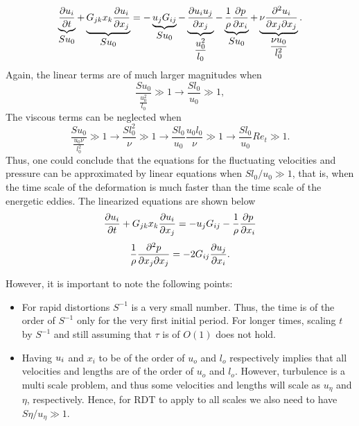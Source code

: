 \documentclass[oneside,a4paper,11pt]{report}
\begin{document}
\begin{equation}
\underbrace{\frac{\partial u_i}{\partial t}}_{\displaystyle Su_0} + \underbrace{G_{jk} x_k \frac{\partial u_i}{\partial x_j}}_{ \displaystyle Su_0} = -\underbrace{u_j G_{ij}}_{\displaystyle S u_0} - \underbrace{\frac{\partial u_i u_j}{\partial x_j}}_{\dfrac{u_0^2}{l_0}} - \underbrace{\frac{1}{\rho} \frac{\partial p}{\partial x_i}}_{\displaystyle Su_0} + \underbrace{\nu \frac{\partial^2 u_i}{\partial x_j \partial x_j}}_{\dfrac{\nu u_0}{l_0^2}}. 
\end{equation}
Again, the linear terms are of much larger magnitudes when
\begin{equation}
\frac{Su_0}{\frac{u_0^2}{l_0}} \gg 1 \to \frac{Sl_0}{u_0} \gg 1,
\end{equation}
The viscous terms can be neglected when
\begin{equation}
\frac{Su_0}{\frac{u_0\nu}{l_0^2}} \gg 1 \to \frac{Sl_0^2}{\nu} \gg 1 \to \frac{Sl_0}{u_0}\frac{u_0l_0}{\nu} \gg 1 \to \frac{Sl_0}{u_0} Re_t \gg 1.
\end{equation}
Thus, one could conclude that the equations for the fluctuating velocities and pressure can be approximated by linear equations when $Sl_0/u_0 \gg 1$, that is, when the time scale of the deformation is much faster than the time scale of the energetic eddies. The linearized equations are shown below
\begin{equation}
\label{ulin}
\frac{\partial u_i}{\partial t} + G_{jk}x_k \frac{\partial u_i}{\partial x_j} = - u_j G_{ij} -\frac{1}{\rho}\frac{\partial p}{\partial x_i}
\end{equation}
\begin{equation}
\frac{1}{\rho} \frac{\partial^2 p}{\partial x_j \partial x_j} = -2G_{ij}\frac{\partial u_j}{\partial x_i}.
\label{plin}
\end{equation}

However, it is important to note the following points:
\begin{itemize}
\item For rapid distortions $S^{-1}$ is a very small number. Thus, the time is of the order of $S^{-1}$ only for the very first initial period. For longer times, scaling $t$ by $S^{-1}$ and still assuming that $\tau$ is of $O(1)$ does not hold.
\item Having $u_i$ and $x_i$ to be of the order of $u_o$ and $l_o$ respectively implies that all velocities and lengths are of the order of $u_o$ and $l_o$. However, turbulence is a multi scale problem, and thus some velocities and lengths will scale as $u_\eta$ and $\eta$, respectively. Hence, for RDT to apply to all scales we also need to have $S\eta/u_\eta \gg 1$.
\end{itemize}
\end{document}

